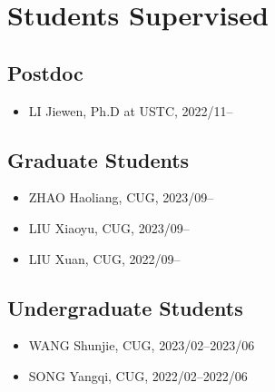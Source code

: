 \section{Students Supervised}

\subsection{Postdoc}
\begin{itemize}
\item LI Jiewen, Ph.D at USTC, 2022/11--
\end{itemize}

\subsection{Graduate Students}
\begin{itemize}
\item ZHAO Haoliang, CUG, 2023/09--
\item LIU Xiaoyu, CUG, 2023/09--
\item LIU Xuan, CUG, 2022/09--
\end{itemize}

\subsection{Undergraduate Students}
\begin{itemize}
\item WANG Shunjie, CUG, 2023/02--2023/06
\item SONG Yangqi, CUG, 2022/02--2022/06
\end{itemize}
